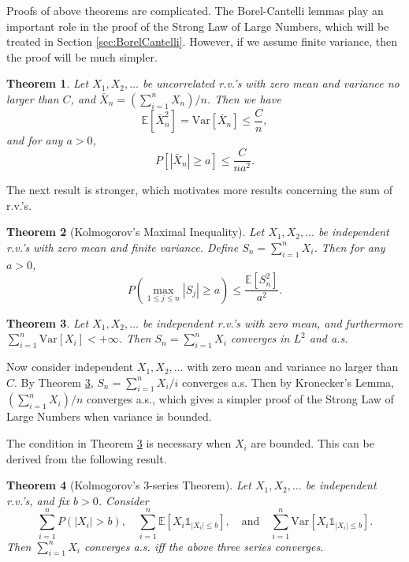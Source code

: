 \documentclass[openany]{book}
\newtheorem{theorem}{Theorem}[chapter]
\theoremstyle{definition}
\theoremstyle{remark}
\begin{document}
Proofs of above theorems are complicated. The Borel-Cantelli lemmas play an important role in the proof of the Strong Law of Large Numbers, which will be treated in Section \ref{sec:BorelCantelli}. However, if we assume finite variance, then the proof will be much simpler.

\begin{theorem}\label{thm:L2WeakLaw}
    Let $X_1,X_2,\ldots$ be uncorrelated r.v.'s with zero mean and variance no larger than $C$, and $\bar{X}_n=(\sum_{i=1}^{n}X_n)/n$. Then we have
    \begin{equation*}
        \mathbb{E}\left[\bar{X}_n^2\right]=\mathrm{Var}\left[\bar{X}_n\right]\le \frac{C}{n},
    \end{equation*}
    and for any $a>0$,
    \begin{equation*}
        P\left[\left|\bar{X}_n\right|\ge a\right]\le \frac{C}{na^2}.
    \end{equation*}
\end{theorem}
The next result is stronger, which motivates more results concerning the sum of r.v.'s.
\begin{theorem}[Kolmogorov's Maximal Inequality]
    Let $X_1,X_2,\ldots$ be independent r.v.'s with zero mean and finite variance. Define $S_n=\sum_{i=1}^{n}X_i$. Then for any $a>0$,
    \begin{equation*}
        P\left(\max_{1\le j\le n}|S_j|\ge a\right)\le \frac{\mathbb{E}[S_n^2]}{a^2}.
    \end{equation*}
\end{theorem}
\begin{theorem}\label{thm:L2Convergence}
    Let $X_1,X_2,\ldots$ be independent r.v.'s with zero mean, and furthermore $\sum_{i=1}^{n}\mathrm{Var}[X_i]<+\infty$. Then $S_n=\sum_{i=1}^{n}X_i$ converges in $L^2$ and a.s.
\end{theorem}
Now consider independent $X_1,X_2,\ldots$ with zero mean and variance no larger than $C$. By Theorem \ref{thm:L2Convergence}, $S_n=\sum_{i=1}^{n}X_i/i$ converges a.s. Then by Kronecker's Lemma, $\left(\sum_{i=1}^{n}X_i\right)/n$ converges a.s., which gives a simpler proof of the Strong Law of Large Numbers when variance is bounded.

The condition in Theorem \ref{thm:L2Convergence} is necessary when $X_i$ are bounded. This can be derived from the following result.
\begin{theorem}[Kolmogorov's 3-series Theorem]
    Let $X_1,X_2,\ldots$ be independent r.v.'s, and fix $b>0$. Consider
    \begin{equation*}
        \sum_{i=1}^{n}P\left(|X_i|>b\right),\quad \sum_{i=1}^{n}\mathbb{E}\left[X_i\mathds{1}_{|X_i|\le b}\right],\quad\textrm{and}\quad \sum_{i=1}^{n}\mathrm{Var}\left[X_i\mathds{1}_{|X_i|\le b}\right].
    \end{equation*}
    Then $\sum_{i=1}^{n}X_i$ converges a.s. iff the above three series converges.
\end{theorem}
\end{document}
